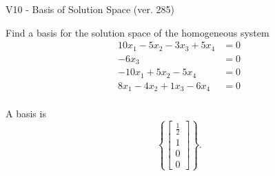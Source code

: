 \begin{exercise}
  \begin{exerciseTitle}V10 - Basis of Solution Space (ver. 285)\end{exerciseTitle}
  \begin{exerciseStatement}
    Find a basis for the solution space of the homogeneous system 
\begin{align*}
 10 x_ 1 -5 x_ 2 -3 x_ 3 + 5 x_ 4 &= 0  \\ 
  -6 x_ 3 &= 0  \\ 
  -10 x_ 1 + 5 x_ 2 -5 x_ 4 &= 0  \\ 
  8 x_ 1 -4 x_ 2 + 1 x_ 3 -6 x_ 4 &= 0  \\ 
 \end{align*}


 
  \end{exerciseStatement}

  \begin{exerciseAnswer}
   A basis is   
\[\left\{\left[\begin{array}{c}
\frac{1}{2} \\
1 \\
0 \\
0
\end{array}\right]\right\}.\]

  


  \end{exerciseAnswer}
\end{exercise}